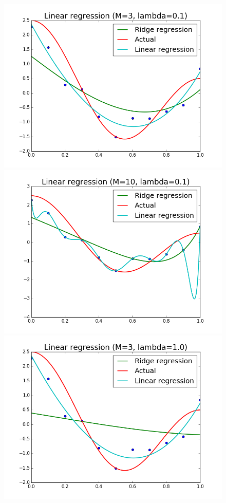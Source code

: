 \documentclass{article}
\begin{document}
\begin{figure}[width=\linewidth]
\centering
\begin{multicols}{2}
  \includegraphics[width=1.2\linewidth]{code/P3/ridge_regression,3,01.png}
  \includegraphics[width=1.2\linewidth]{code/P3/ridge_regression,10,01.png}
  \includegraphics[width=1.2\linewidth]{code/P3/ridge_regression,3,1.png}

\end{multicols}
\end{figure}
\end{document}
